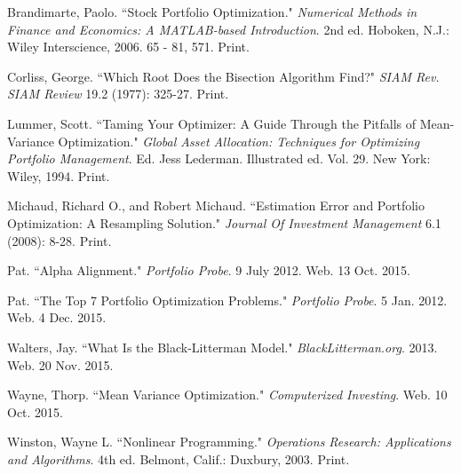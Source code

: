 \documentclass[12pt,titlepage,letter]{article}
\begin{document}
\newpage
\begin{thebibliography}{10}
	 Brandimarte, Paolo. ``Stock Portfolio Optimization."  \emph{Numerical Methods in Finance and Economics: A MATLAB-based Introduction}. 2nd ed. Hoboken, N.J.: Wiley Interscience, 2006. 65 - 81, 571. Print.

	 Corliss, George. ``Which Root Does the Bisection Algorithm Find?" \emph{SIAM Rev. SIAM Review} 19.2 (1977): 325-27. Print.
	
	 Lummer, Scott. ``Taming Your Optimizer: A Guide Through the Pitfalls of Mean-Variance Optimization." \emph{Global Asset Allocation: Techniques for Optimizing Portfolio Management}. Ed. Jess Lederman. Illustrated ed. Vol. 29. New York: Wiley, 1994. Print.
	
	 Michaud, Richard O., and Robert Michaud. ``Estimation Error and Portfolio Optimization: A Resampling Solution." \emph{Journal Of Investment Management} 6.1 (2008): 8-28. Print.
	
	 Pat. ``Alpha Alignment." \emph{Portfolio Probe}. 9 July 2012. Web. 13 Oct. 2015.
	
	 Pat. ``The Top 7 Portfolio Optimization Problems."  \emph{Portfolio Probe}. 5 Jan. 2012. Web. 4 Dec. 2015.

	 Walters, Jay. ``What Is the Black-Litterman Model." \emph{BlackLitterman.org}. 2013. Web. 20 Nov. 2015.

	 Wayne, Thorp. ``Mean Variance Optimization."  \emph{Computerized Investing}. Web. 10 Oct. 2015.
	
	 Winston, Wayne L. ``Nonlinear Programming."  \emph{Operations Research: Applications and Algorithms}. 4th ed. Belmont, Calif.: Duxbury, 2003. Print.
\end{thebibliography}
\end{document}
